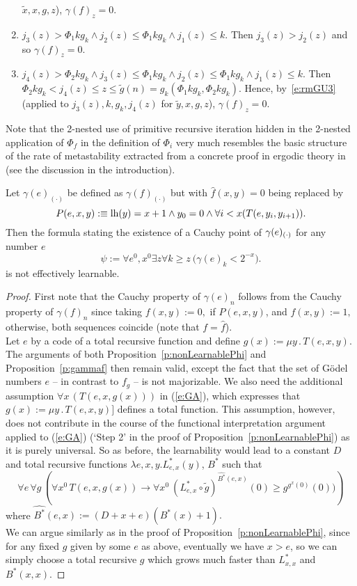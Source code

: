 \begin{rmk}
\begin{enumerate}
$\tilde{x},x,g,z$), $\gamma(f)_z=0$.
\item $j_3(z)>\Phi_1 kg_k\wedge j_2(z)\leq\Phi_1 kg_k\wedge j_1(z)\leq k$. Then $j_3(z)>j_2(z)$ and so $\gamma(f)_z=0$.
\item $j_4(z)>\Phi_2 kg_k\wedge j_3(z)\leq\Phi_1 kg_k\wedge j_2(z)\leq\Phi_1 kg_k\wedge j_1(z)\leq k$. 
Then 
$
\Phi_2 kg_k < j_4(z)\leq z \leq \tilde g(n)=g_k(\Phi_1 kg_k,\Phi_2 kg_k).
$
Hence, by~\eqref{e:rmGU3} (applied to $j_3(z),k,g_k,j_4(z)$ for 
$\tilde{y},x,g,z$), $\gamma(f)_z=0$.
\end{enumerate}
Note that the 2-nested use of primitive recursive iteration hidden in the 
2-nested application of 
$\Phi_f$ in the definition of $\Phi_i$ very much resembles the basic 
structure of the rate of metastability extracted from a concrete proof 
in ergodic theory in \cite{Safarik(11)} (see the discussion in the 
introduction).
\end{rmk}

\begin{cor}\label{c:gammae}
Let $\gamma(e)_{(\cdot)}$ be defined as $\gamma(f)_{(\cdot)}$ but 
with $\widehat{f}(x,y)=0$ being replaced by 
\[ P(e,x,y):\equiv \mbox{\rm lh} (y)=x+1\wedge y_0=0\wedge\forall i<x(T(e,y_i,y_{i+1})).\]  
Then
the formula stating the existence of a Cauchy point of 
$\gamma(e)_{(\cdot)}$ for any number $e$  
\[
\psi:=\forall e^0,x^0\exists z \forall k\geq z\ \big( \gamma(e)_k<2^{-x} \big).
\]
is not effectively learnable.
\end{cor}

\begin{proof}
First note that the Cauchy property of $\gamma(e)_n$ follows from the 
Cauchy property of $\gamma(f)_n$ since taking $f(x,y):=0,$ if $P(e,x,y)$, 
and $f(x,y):=1,$ otherwise, both sequences coincide (note that 
$f=\widehat{f}$).\\ 
Let $e$ by a code of a total recursive function and define $g(x):=\mu 
y\,.\,T(e,x,y).$
The arguments of both Proposition~\ref{p:nonLearnablePhi} and Proposition~\ref{p:gammaf} then remain valid,
except the fact that the set of 
G\"odel numbers $e$ -- in contrast to $f_g$  -- is not majorizable. 
We also need the additional assumption $\forall x\,(T(e,x,g(x)))$ in 
(\ref{e:GA}), which 
expresses that $g(x):=\mu y\,.\,T(e,x,y)]$ defines a total function. This 
assumption, however, does not contribute in the course of the functional 
interpretation argument applied to (\ref{e:GA}) (`Step 2' in the proof of 
Proposition~\ref{p:nonLearnablePhi}) as it is purely universal. 
So as before, the learnability would lead to a constant $D$ and 
total recursive functions $\lambda e,x,y.
L^*_{e,x}(y)$, $B^*$ such that
\[ \forall e\,\forall g\,\left(\forall x^0 \,T(e,x,g(x))\rightarrow 
\forall x^0\ (L^*_{e,x}\circ \tilde{g})^{\widehat{B^*}(e,x)}(0)
\geq g^{g^{x}(0)}(0))\right)\] where 
$\widehat{B^*}(e,x):=(D+x+e)(B^*(x)+1).$  \\ 
We can argue similarly as in the proof of Proposition~\ref{p:nonLearnablePhi}, 
since for any fixed $g$ given by some $e$ as above, eventually we have $x>e$, 
so we can simply choose
a total recursive $g$ which grows much faster than $L^*_{x,x}$ and $B^*(x,x)$.
\end{proof}

